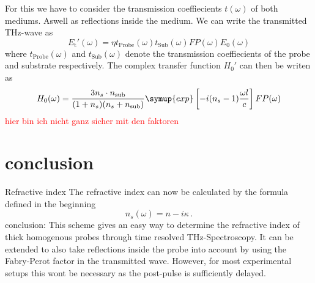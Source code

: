 \documentclass[aspectratio=1610, 9pt]{beamer}
\begin{document}
\begin{frame}
  For this we have to consider the transmission coeffiecients $t(\omega)$ of both mediums.
  Aswell as reflections inside the medium.
  We can write the transmitted THz-wave as
  \begin{equation}
    E_\text{t} '(\omega) = \eta t_\text{Probe}(\omega) t_\text{Sub}(\omega)FP(\omega)E_0(\omega)
  \end{equation}
  where $t_\text{Probe}(\omega)$ and $t_\text{Sub}(\omega)$ denote the transmission coeffiecients of the probe and substrate respectively.
  The complex transfer function $H_0'$ can then be writen as 
  \begin{equation}
    H_0(\omega) = \frac{3 n_s \cdot n_\text{sub}}{(1 + n_s)(n_s + n_\text{sub})} \symup{exp}\left[-i (n_s - 1)\frac{\omega l}{c}\right]FP(\omega)
  \end{equation}
  \textcolor{red}{hier bin ich nicht ganz sicher mit den faktoren}
\end{frame}

\section{conclusion}
\begin{frame}{Refractive index}
  The refractive index can now be calculated by the formula defined in the beginning
  \begin{equation}
    n_s(\omega) = n - i \kappa \, .
  \end{equation}
  \newline
  \textcolor{tugreen}{conclusion:} This scheme gives an easy way to determine the refractive index of thick homogenous probes through time resolved THz-Spectroscopy.
  It can be extended to also take reflections inside the probe into account by using the Fabry-Perot factor in the transmitted wave.
  However, for most experimental setups this wont be necessary as the post-pulse is sufficiently delayed.

\end{frame}
\end{document}
